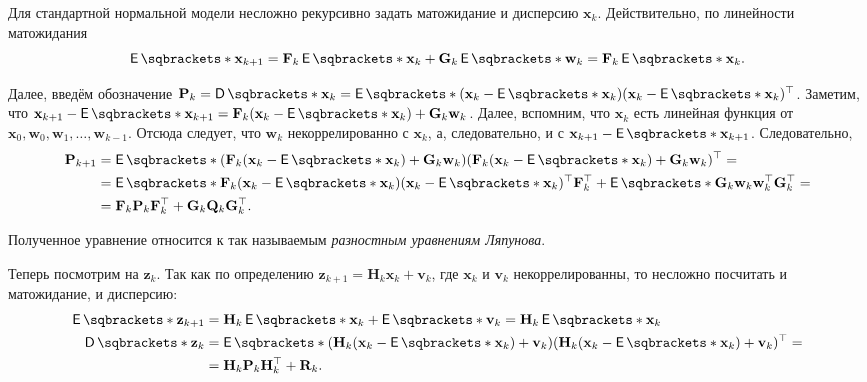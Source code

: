 Для стандартной нормальной модели несложно рекурсивно задать матожидание и 
дисперсию \(\mathbf{x}_{k}\). Действительно, по линейности матожидания
\[
	\E{\mathbf{x}_{k + 1}} = \mathbf{F}_{k}\E{\mathbf{x}_{k}} + 
	\mathbf{G}_{k}\E{\mathbf{w}_{k}} = \mathbf{F}_{k}\E{\mathbf{x}_{k}}.
\]

Далее, введём обозначение \(\mathbf{P}_{k} = \D{\mathbf{x}_{k}} = 
\E{(\mathbf{x}_{k} - \E{\mathbf{x}_{k}})(\mathbf{x}_{k} - 
\E{\mathbf{x}_{k}})^{\top}}\).  Заметим, что \(\mathbf{x}_{k + 1} - 
\E{\mathbf{x}_{k + 1}}= \mathbf{F}_{k}(\mathbf{x}_{k} - \E{\mathbf{x}_{k}}) + 
\mathbf{G}_{k}\mathbf{w}_{k}\). Далее, вспомним, что \(\mathbf{x}_{k}\) есть 
линейная функция от \(\mathbf{x}_{0}, \mathbf{w}_{0}, \mathbf{w}_{1}, \ldots, 
\mathbf{w}_{k - 1}\). Отсюда следует, что \(\mathbf{w}_{k}\) некоррелированно с 
\(\mathbf{x}_{k}\), а, следовательно, и с \(\mathbf{x}_{k + 1} - 
\E{\mathbf{x}_{k + 1}}\). Следовательно,
\begin{align*}
	\mathbf{P}_{k + 1} &= \E{(\mathbf{F}_{k}(\mathbf{x}_{k} - 
	\E{\mathbf{x}_{k}}) + \mathbf{G}_{k}\mathbf{w}_{k}) 
	(\mathbf{F}_{k}(\mathbf{x}_{k} - \E{\mathbf{x}_{k}}) + 
	\mathbf{G}_{k}\mathbf{w}_{k})^{\top}} = \\
	&= \E{\mathbf{F}_{k}(\mathbf{x}_{k} - \E{\mathbf{x}_{k}})(\mathbf{x}_{k} - 
	\E{\mathbf{x}_{k}})^{\top}\mathbf{F}_{k}^{\top}} + 
	\E{\mathbf{G}_{k}\mathbf{w}_{k}\mathbf{w}_{k}^{\top} 
	\mathbf{G}_{k}^{\top}} = \\
	&= \mathbf{F}_{k}\mathbf{P}_{k}\mathbf{F}_{k}^{\top} + 
	\mathbf{G}_{k}\mathbf{Q}_{k}\mathbf{G}_{k}^{\top}.
\end{align*}

Полученное уравнение относится к так называемым \emph{разностным уравнениям 
Ляпунова}.

Теперь посмотрим на \(\mathbf{z}_{k}\). Так как по определению \(\mathbf{z}_{k 
+ 1} = \mathbf{H}_{k}\mathbf{x}_{k} + \mathbf{v}_{k}\), где \(\mathbf{x}_{k}\) 
и \(\mathbf{v}_{k}\) некоррелированны, то несложно посчитать и матожидание, и 
дисперсию:
\begin{align*}
	\E{\mathbf{z}_{k + 1}} &= \mathbf{H}_{k}\E{\mathbf{x}_{k}} + 
	\E{\mathbf{v}_{k}} = \mathbf{H}_{k}\E{\mathbf{x}_{k}} \\
	\D{\mathbf{z}_{k}} &= \E{(\mathbf{H}_{k}(\mathbf{x}_{k} - 
	\E{\mathbf{x}_{k}}) + \mathbf{v}_{k})(\mathbf{H}_{k}(\mathbf{x}_{k} - 
	\E{\mathbf{x}_{k}}) + \mathbf{v}_{k})^{\top}} = \\
	&= \mathbf{H}_{k}\mathbf{P}_{k}\mathbf{H}_{k}^{\top} + \mathbf{R}_{k}.
\end{align*}

